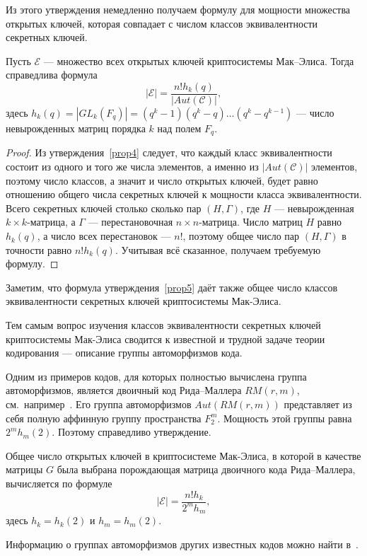 Из этого утверждения немедленно получаем формулу для мощности
множества открытых ключей, которая совпадает с числом классов
эквивалентности секретных ключей.

\begin{proposition}\label{prop5}
Пусть $\mathcal E$ --- множество всех открытых ключей
криптосистемы Мак--Элиса. Тогда справедлива формула
$$
|\mathcal E|=\frac{n!h_k(q)}{|Aut(\mathcal C)|},
$$
здесь $h_k(q)=|GL_k(F_q)|=(q^k-1)(q^k-q)\ldots (q^k-q^{k-1})$ ---
число невырожденных матриц порядка $k$ над полем $F_q$.
\end{proposition}
\begin{proof}
Из утверждения~\ref{prop4} следует, что каждый класс
эквивалентности состоит из одного и того же числа элементов, а
именно из $|Aut(\mathcal C)|$ элементов, поэтому число классов, а
значит и число открытых ключей, будет равно отношению общего числа
секретных ключей к мощности класса эквивалентности. Всего
секретных ключей столько сколько пар $(H,\Gamma)$, где $H$
--- невырожденная $k\times k$-матрица, а $\Gamma$ ---
перестановочная $n\times n$-матрица. Число матриц $H$ равно
$h_k(q)$, а число всех перестановок --- $n!$, поэтому общее число
пар $(H,\Gamma)$ в точности равно $n!h_k(q)$. Учитывая всё
сказанное, получаем требуемую формулу.
\end{proof}
Заметим, что формула утверждения~\ref{prop5} даёт также общее
число  классов эквивалентности секретных ключей криптосистемы
Мак-Элиса.

Тем самым вопрос изучения классов эквивалентности секретных ключей
криптосистемы Мак-Элиса сводится к известной и трудной задаче
теории кодирования
--- описание группы автоморфизмов кода.

Одним из примеров кодов, для которых полностью вычислена группа
автоморфизмов, является двоичный код Рида--Маллера $RM(r,m)$, см.\
например~\cite{McWilliams}. Его группа автоморфизмов
$Aut(RM(r,m))$ представляет из себя полную аффинную группу
пространства $F^m_2$. Мощность этой группы равна $2^mh_m(2)$.
Поэтому справедливо утверждение.

\begin{proposition}
Общее число открытых ключей в криптосистеме Мак-Элиса, в которой в
качестве матрицы $G$ была выбрана порождающая матрица двоичного
кода Рида--Маллера, вычисляется по формуле
$$
|\mathcal E|=\frac{n!h_k}{2^mh_m},
$$
здесь $h_k=h_k(2)$ и $h_m=h_m(2)$.
\end{proposition}

Информацию о группах автоморфизмов других известных кодов можно
найти в~\cite{HandBook}.